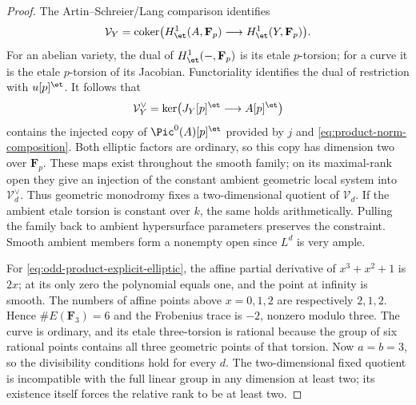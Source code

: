 \begin{proof}
The Artin--Schreier/Lang comparison identifies
\[
 \mathcal V_Y=\operatorname{coker}
       \bigl(H^1_{\et}(A,\mathbf F_p)
                 \longrightarrow H^1_{\et}(Y,\mathbf F_p)\bigr).
\]
For an abelian variety, the dual of $H^1_{\et}(-,\mathbf F_p)$
is its etale $p$-torsion; for a curve it is the etale
$p$-torsion of its Jacobian.  Functoriality identifies
the dual of restriction with $u[p]^{\et}$.
It follows that
\[
 \mathcal V_Y^\vee
   =\ker\bigl(J_Y[p]^{\et}\longrightarrow A[p]^{\et}\bigr)
\]
contains the injected copy of $\Pic^0(A)[p]^{\et}$
provided by $j$ and \eqref{eq:product-norm-composition}.
Both elliptic factors are ordinary, so this copy has
dimension two over $\mathbf F_p$.
These maps exist throughout the smooth family; on its
maximal-rank open they give an injection of the constant
ambient geometric local system into $\mathcal V_d^\vee$.
Thus geometric monodromy fixes a two-dimensional quotient
of $\mathcal V_d$.  If the ambient etale torsion is
constant over $k$, the same holds arithmetically.
Pulling the family back to ambient hypersurface
parameters preserves the constraint.  Smooth ambient
members form a nonempty open since $L^d$ is very ample.

For \eqref{eq:odd-product-explicit-elliptic}, the affine
partial derivative of $x^3+x^2+1$ is $2x$; at its only
zero the polynomial equals one, and the point at
infinity is smooth.  The numbers of affine points
above $x=0,1,2$ are respectively $2,1,2$.
Hence $\#E(\mathbf F_3)=6$ and the Frobenius trace
is $-2$, nonzero modulo three.  The curve is ordinary,
and its etale three-torsion is rational because the
group of six rational points contains all three
geometric points of that torsion.
Now $a=b=3$, so the divisibility conditions hold for
every $d$.  The two-dimensional fixed quotient is
incompatible with the full linear group in any
dimension at least two; its existence itself forces
the relative rank to be at least two.
\end{proof}

